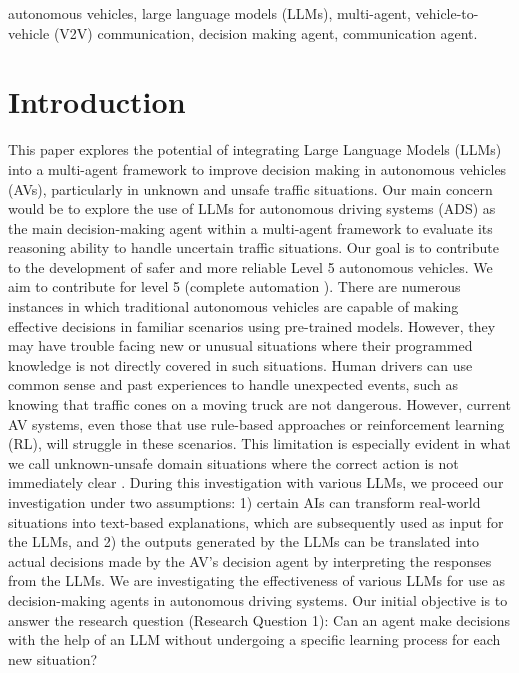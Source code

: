 \documentclass[conference]{IEEEtran}
\begin{document}
\begin{IEEEkeywords}
autonomous vehicles, large language models (LLMs), multi-agent, vehicle-to-vehicle (V2V) communication, decision making agent, communication agent.

\end{IEEEkeywords}

\IEEEpeerreviewmaketitle



\section{Introduction}

This paper explores the potential of integrating Large Language Models (LLMs)\cite{chang2024survey} into a multi-agent framework\cite{10707898} to improve decision making in autonomous vehicles (AVs), particularly in unknown and unsafe traffic situations.
Our main concern would be to explore the use of LLMs for autonomous driving systems (ADS) as the main decision-making agent within a multi-agent framework to evaluate its reasoning ability\cite{10707968} to handle uncertain traffic situations. Our goal is to contribute to the development of safer and more reliable Level 5\cite{cho2020more} autonomous vehicles. We aim to contribute for level 5 (complete automation \cite{raza2018autonomous}). There are numerous instances in which traditional autonomous vehicles are capable of making effective decisions in familiar scenarios using pre-trained models.  However, they may have trouble facing new or unusual situations where their programmed knowledge is not directly covered in such situations. Human drivers can use common sense and past experiences to handle unexpected events, such as knowing that traffic cones on a moving truck are not dangerous. However, current AV systems, even those that use rule-based approaches or reinforcement learning (RL\cite{kaelbling1996reinforcement}), will struggle in these scenarios. This limitation is especially evident in what we call unknown-unsafe domain situations where the correct action is not immediately clear \cite{fu2024drive}.
During this investigation with various LLMs, we proceed our investigation under two assumptions: 1) certain AIs can transform real-world situations into text-based explanations, which are subsequently used as input for the LLMs, and 2) the outputs generated by the LLMs can be translated into actual decisions made by the AV’s decision agent by interpreting the responses from the LLMs. We are investigating the effectiveness of various LLMs for use as decision-making agents in autonomous driving systems. Our initial objective is to answer the research question (Research Question 1): Can an agent make decisions with the help of an LLM without undergoing a specific learning process for each new situation?
\end{document}
